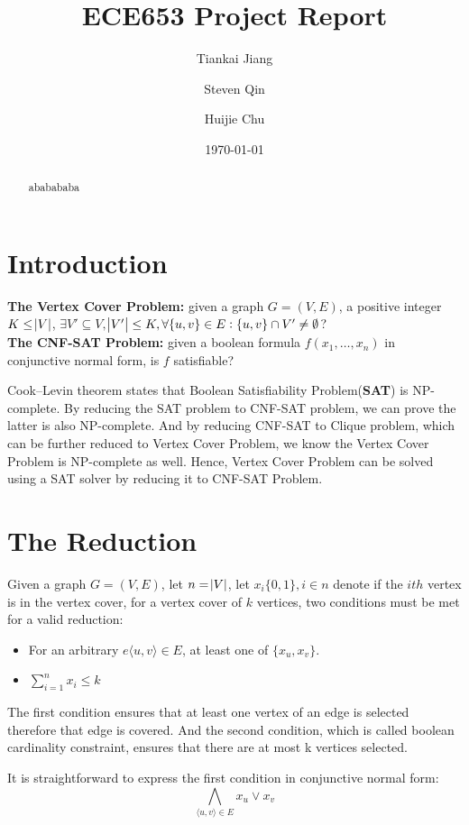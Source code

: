 \documentclass[11pt]{article}
\title{ECE653 Project Report}
\author{Tiankai Jiang \and Steven Qin \and Huijie Chu}
\date{\today}
\begin{document}
\maketitle

\begin{abstract}
ababababa
\end{abstract}
\section{Introduction}\label{section-introduction}
\textbf{The Vertex Cover Problem:} given a graph $G=(V,E)$, a positive integer $K\leq \abs{V}$, $\exists V'\subseteq V,$\linebreak$\abs{V'} \leq K, \forall \{u,v\}\in E: \{u,v\}\cap V' \neq \emptyset$?\\
\textbf{The CNF-SAT Problem:} given a boolean formula $f(x_1,\ldots ,x_n)$ in conjunctive normal form, is $f$ satisfiable? 

Cook–Levin theorem states that Boolean Satisfiability Problem(\textbf{SAT}) is NP-complete. By reducing the SAT problem to CNF-SAT problem, we can prove the latter is also NP-complete. And by reducing CNF-SAT to Clique problem, which can be further reduced to Vertex Cover Problem, we know the Vertex Cover Problem is NP-complete as well. Hence, Vertex Cover Problem can be solved using a SAT solver by reducing it to CNF-SAT Problem.

\section{The Reduction}\label{section-reduction}
Given a graph $G=(V,E)$, let $n=\abs{V}$, let $x_i\{0, 1\}, i \in n$ denote if the $ith$ vertex is in the vertex cover, for a vertex cover of $k$ vertices, two conditions must be met\cite{Stamm-wilbrandt93programmingin} for a valid reduction:
\begin{itemize}
  \item For an arbitrary $e\langle u,v\rangle \in E$, at least one of $\{x_u,x_v\}$.
  \item $\sum\limits_{i=1}^{n}x_i\leq k$
\end{itemize}

The first condition ensures that at least one vertex of an edge is selected therefore that edge is covered. And the second condition, which is called boolean cardinality constraint, ensures that there are at most k vertices selected.

It is straightforward to express the first condition in conjunctive normal form:\[\bigwedge\limits_{\langle u,v\rangle \in E} x_u \lor x_v \]
\end{document}
